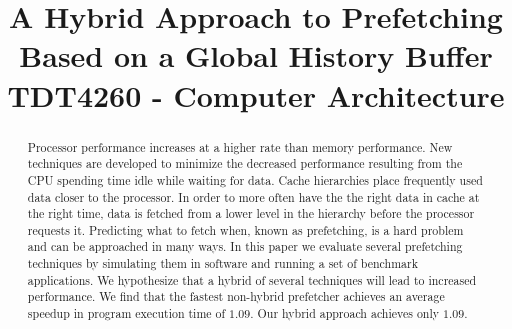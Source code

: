 \documentclass[technote]{IEEEtran}
\begin{document}
\title{A Hybrid Approach to Prefetching Based on a Global History Buffer\\ TDT4260 - Computer Architecture}

\author{

}

\maketitle

\begin{abstract}
  Processor performance increases at a higher rate than memory
  performance. New techniques are developed to minimize the decreased
  performance resulting from the CPU spending time idle while waiting
  for data. Cache hierarchies place frequently used data closer to the
  processor. In order to more often have the the right data in cache
  at the right time, data is fetched from a lower level in the
  hierarchy before the processor requests it. Predicting what to fetch
  when, known as prefetching, is a hard problem and can be approached
  in many ways. In this paper we evaluate several prefetching
  techniques by simulating them in software and running a set of
  benchmark applications. We hypothesize that a hybrid of several
  techniques will lead to increased performance. We find that the
  fastest non-hybrid prefetcher achieves an average speedup in program
  execution time of $1.09$. Our hybrid approach achieves only $1.09$.
\end{abstract}

\listoftodos










\end{document}
